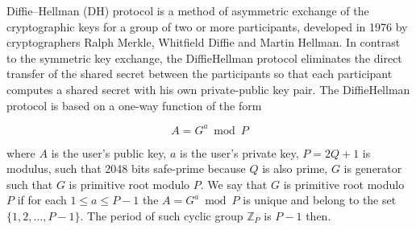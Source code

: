 Diffie--Hellman (DH) protocol is a method of asymmetric exchange
of the cryptographic keys for a group of two or more participants,
developed in 1976 by cryptographers Ralph Merkle, Whitfield Diffie and Martin Hellman.
In contrast to the symmetric key exchange,
the Diffie\textendash Hellman protocol eliminates the direct transfer of the shared secret
between the participants so that each participant computes a shared secret with his own private-public key pair.
The Diffie\textendash Hellman protocol is based on a one-way function of the form

\begin{equation}
    A = G ^ a \bmod P \label{eq:equation}
\end{equation}

where $A$ is the user's public key,
$a$ is the user's private key,
$P=2Q+1$ is modulus, such that 2048 bits safe-prime because $Q$ is also prime,
$G$ is generator such that $G$ is primitive root modulo $P$.
We say that $G$ is primitive root modulo $P$ if for each $1 \leq a \leq P - 1$ the $A = G ^ a \bmod P$
is unique and belong to the set $\{1, 2, \dots, P-1\}$.
The period of such cyclic group $\mathbb{Z}_{P}$ is $P-1$ then.

